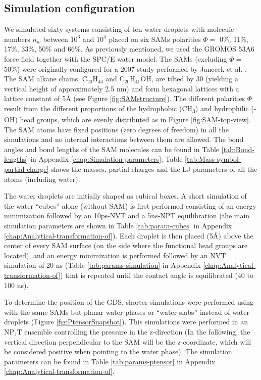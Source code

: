 \subsection{Simulation configuration}

We simulated sixty systems consisting of ten water droplets with molecule
numbers $n_{w}$ between $10^{3}$ and $10^{4}$ placed on six SAMs
polarities $\Phi=$ 0\%, 11\%, 17\%, 33\%, 50\% and 66\%. As previously
mentioned, we used the GROMOS 53A6 force field together with the SPC/E
water model. The SAMs (excluding $\Phi=$50\%) were originally configured
for a 2007 study performed by Janecek et al. \cite{janecek:2007}.
The SAM alkane chains, $\mathrm{C_{20}H_{44}}$ and $\mathrm{C_{20}H_{41}OH}$,
are tilted by 30\textdegree{} (yielding a vertical height of approximately
2.5 nm) and form hexagonal lattices with a lattice constant of 5{\AA }
(see Figure \ref{fig:SAMstructure}). The different polarities $\Phi$
result from the different proportions of the hydrophobic (CH\textsubscript{3})
and hydrophilic (-OH) head groups, which are evenly distributed as
in Figure \ref{fig:SAM-top-view}. The SAM atoms have fixed positions
(zero degrees of freedom) in all the simulations and no internal interactions
between them are allowed. The bond angles and bond lengths of the
SAM molecules can be found in Table \ref{tab:Bond-lengths} in Appendix
\ref{chap:Simulation-parameters}; Table \ref{tab:Mass-symbol-partial-charge}
shows the masses, partial charges and the LJ-parameters of all the
atoms (including water).

The water droplets are initially shaped as cubical boxes. A short
simulation of the water ``cubes'' alone (without SAM) is first performed
consisting of an energy minimization followed by an 10ps-NVT and a
5ns-NPT equilibration (the main simulation parameters are shown in
Table \ref{tab:param-cubes} in Appendix \ref{chap:Analytical-transformation-of}).
Each droplet is then placed (5{\AA }) above the center of every
SAM surface (on the side where the functional head groups are located),
and an energy minimization is performed followed by an NVT simulation
of 20 ns (Table \ref{tab:params-simulation} in Appendix \ref{chap:Analytical-transformation-of})
that is repeated until the contact angle is equilibrated (40 to 100
ns).

To determine the position of the GDS, shorter simulations were performed
using with the same SAMs but planar water phases or ``water slabs''
instead of water droplets (Figure \ref{fig:PtensorSnapshot}). This
simulations were performed in an NP$_{z}$T ensemble controlling the
pressure in the z-direction (In the following, the vertical direction
perpendicular to the SAM will be the z-coordinate, which will be considered
positive when pointing to the water phase). The simulation parameters
can be found in Table \ref{tab:params-ptensor} in Appendix \ref{chap:Analytical-transformation-of}.